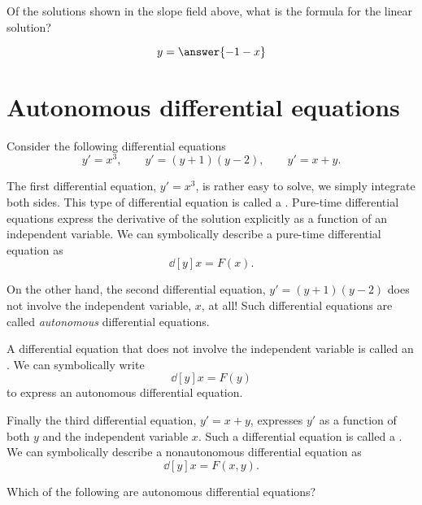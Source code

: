 \documentclass{ximera}
\begin{document}
\begin{question}
  Of the solutions shown in the slope field above, what is the formula
  for the linear solution?
  \begin{prompt}
    \[
    y = \answer{-1-x}
    \]
  \end{prompt}
\end{question}



\section{Autonomous differential equations}


Consider the following differential equations
\[
y' = x^3,\qquad y'=(y+1)(y-2), \qquad y'= x+y.
\]

The first differential equation, $y' = x^3$, is rather easy to solve,
we simply integrate both sides. This type of differential equation is
called a . Pure-time differential
equations express the derivative of the solution explicitly as a
function of an independent variable. We can symbolically describe a
pure-time differential equation as
\[
\dd[y]{x} = F(x).
\]

On the other hand, the second differential equation, $y'=(y+1)(y-2)$
does not involve the independent variable, $x$, at all!  Such
differential equations are called \textit{autonomous} differential
equations.

\begin{definition}
  A differential equation that does not involve the independent
  variable is called an . We can
  symbolically write
  \[
  \dd[y]{x} = F(y)
  \]
  to express an autonomous differential equation.
\end{definition}

Finally the third differential equation, $y'= x+y$, expresses $y'$ as
a function of both $y$ and the independent variable $x$. Such a
differential equation is called a . We can symbolically describe  a nonautonomous differential equation as
\[
\dd[y]{x} = F(x,y).
\]
\begin{question}
  Which of the following are autonomous differential equations?
  \begin{selectAll}
  \end{selectAll}
\end{question}
\end{document}

